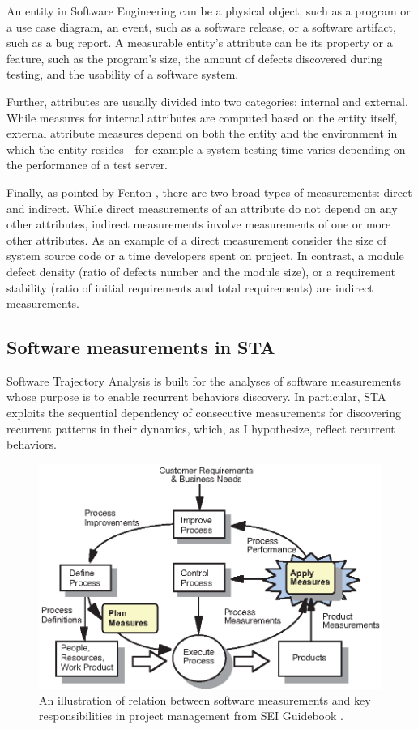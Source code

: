 An entity in Software Engineering can be a physical object, such as a program or a use case diagram, 
an event, such as a software release, or a software artifact, such as a bug report.
A measurable entity's attribute can be its property or a feature, such as the program's size, the 
amount of defects discovered during testing, and the usability of a software system.

Further, attributes are usually divided into two categories: internal and external. 
While measures for internal attributes are computed based on the entity itself, external attribute 
measures depend on both the entity and the environment in which the entity resides - for example a 
system testing time varies depending on the performance of a test server.

Finally, as pointed by Fenton \cite{citeulike:1803429}, there are two broad types of measurements: direct
and indirect. While direct measurements of an attribute do not depend on any other attributes, 
indirect measurements involve measurements of one or more other attributes. 
As an example of a direct measurement consider the size of system source code or a time developers spent on 
project. In contrast, a module defect density (ratio of defects number and the module size), 
or a requirement stability (ratio of initial requirements and total requirements) are indirect measurements.

\subsection{Software measurements in STA}
Software Trajectory Analysis is built for the analyses of software measurements whose purpose is to enable 
recurrent behaviors discovery. In particular, STA exploits the sequential dependency of consecutive 
measurements for discovering recurrent patterns in their dynamics, which, as I hypothesize, reflect recurrent 
behaviors.

\begin{figure}[t]
   \centering
   \includegraphics[width=115mm]{figures/SEI-measurements.eps}
   \caption{An illustration of relation between software measurements and key responsibilities 
   in project management from SEI Guidebook \cite{citeulike:10567306}.}
   \label{fig:sei-measures}
\end{figure}

